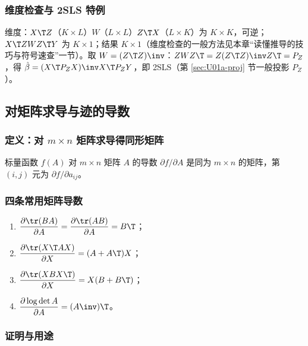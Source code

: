 \subsubsection{维度检查与 2SLS 特例}

维度：$X\T Z$（$K\times L$）$W$（$L\times L$）$Z\T X$（$L\times K$）为 $K\times K$，可逆；$X\T ZWZ\T Y$ 为 $K\times1$；结果 $K\times1$（维度检查的一般方法见本章“读懂推导的技巧与符号速查”一节）。取 $W=(Z\T Z)\inv$：$ZWZ\T=Z(Z\T Z)\inv Z\T=P_Z$，得 $\hat\beta=(X\T P_ZX)\inv X\T P_ZY$，即 2SLS（第 \ref{sec:U01a-proj} 节一般投影 $P_Z$）。

\subsection{对矩阵求导与迹的导数}

\subsubsection{定义：对 \texorpdfstring{$m\times n$}{m x n} 矩阵求导得同形矩阵}

\begin{defn}[对矩阵求导]\label{def:U01a-matdiff}
标量函数 $f(A)$ 对 $m\times n$ 矩阵 $A$ 的导数 $\partial f/\partial A$ 是同为 $m\times n$ 的矩阵，第 $(i,j)$ 元为 $\partial f/\partial a_{ij}$。
\end{defn}

\subsubsection{四条常用矩阵导数}

\begin{thm}[常用矩阵导数]\label{thm:U01a-matdiff}
\begin{enumerate}
  \item $\dfrac{\partial\tr(BA)}{\partial A}=\dfrac{\partial\tr(AB)}{\partial A}=B\T$；
  \item $\dfrac{\partial\tr(X\T AX)}{\partial X}=(A+A\T)X$；
  \item $\dfrac{\partial\tr(XBX\T)}{\partial X}=X(B+B\T)$；
  \item $\dfrac{\partial\log\det A}{\partial A}=(A\inv)\T$。
\end{enumerate}
\end{thm}

\subsubsection{证明与用途}


